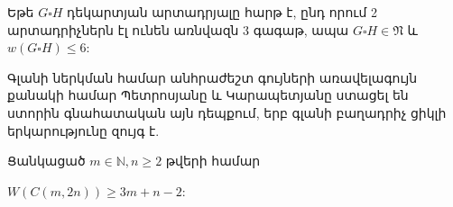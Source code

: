 \begin{theorem}
\label{t2_planars} Եթե $G\square H$ դեկարտյան արտադրյալը հարթ է, ընդ որում 2 արտադրիչներն էլ ունեն առնվազն $3$ գագաթ, ապա $G\square H\in \mathfrak{N}$ և $w(G\square H)\leq 6$:
\end{theorem}

Գլանի ներկման համար անհրաժեշտ գույների առավելագույն քանակի համար Պետրոսյանը և Կարապետյանը \cite{PetrosyanKarapetyan2007} ստացել են ստորին գնահատական այն դեպքում, երբ գլանի բաղադրիչ ցիկլի երկարությունը զույգ է.
\begin{theorem}
\label{t2_cylinder_W_evencycle} Ցանկացած $m\in \mathbb{N}, n\geq 2$ թվերի համար
\begin{center}
$W(C(m,2n))\geq 3m+n-2$:
\end{center}
\end{theorem}


